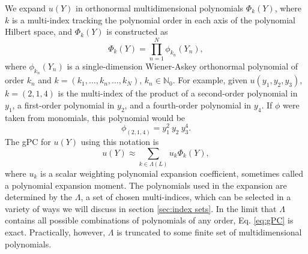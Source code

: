 We expand $u(Y)$ in orthonormal multidimensional polynomials $\Phi_k(Y)$, where $k$ is a multi-index tracking
the polynomial order in each axis of the polynomial Hilbert space, and $\Phi_k(Y)$ is constructed as
\begin{equation}
  \Phi_k(Y) = \prod_{n=1}^N \phi_{k_n}(Y_n),
\end{equation}
where $\phi_{k_n}(Y_n)$ is a single-dimension Wiener-Askey orthonormal polynomial of order $k_n$ and
$k=(k_1,\ldots,k_n,\ldots,k_N)$, $k_n\in\mathbb{N}_0$.  For example, given $u(y_1,y_2,y_3)$, $k=(2,1,4)$
is the multi-index of the
product of a second-order polynomial in $y_1$, a first-order polynomial in $y_2$, and a fourth-order
polynomial in $y_4$. If $\phi$ were taken from monomials, this polynomial would be
\begin{equation}
  \phi_{(2,1,4)} = y_1^2\ y_2\ y_3^4.
\end{equation}
The gPC for $u(Y)$ using this notation is
\begin{equation}\label{eq:gPC}
  u(Y) \approx \sum_{k\in\Lambda(L)} u_k\Phi_k(Y),
\end{equation}
where $u_k$ is a scalar weighting polynomial expansion coefficient, sometimes called a polynomial expansion
moment. The polynomials used in the expansion are determined
by the $\Lambda$, a set of chosen multi-indices, which can be selected in a variety of ways we will discuss in section
\ref{sec:index sets}.  In the limit
that $\Lambda$ contains all possible combinations of polynomials of any order, Eq. \ref{eq:gPC} is exact.
Practically, however, $\Lambda$ is truncated to some finite set of multidimensional polynomials.

